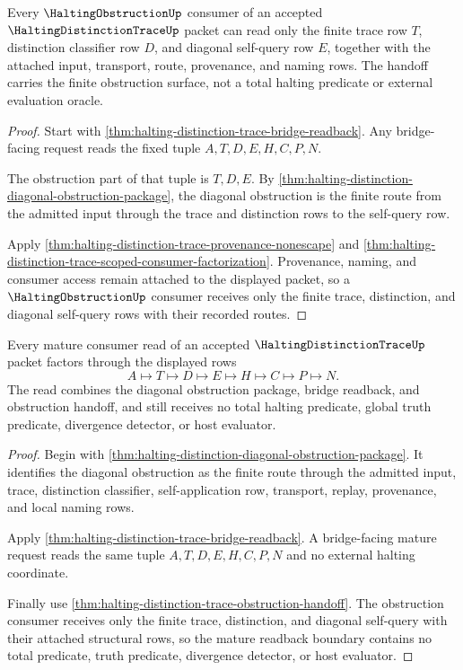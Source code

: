 \begin{theorem}
\label{thm:halting-distinction-trace-obstruction-handoff}
Every $\HaltingObstructionUp$ consumer of an accepted $\HaltingDistinctionTraceUp$ packet can read only the finite trace row $T$, distinction classifier row $D$, and diagonal self-query row $E$, together with the attached input, transport, route, provenance, and naming rows. The handoff carries the finite obstruction surface, not a total halting predicate or external evaluation oracle.
\end{theorem}
\begin{proof}
Start with \autoref{thm:halting-distinction-trace-bridge-readback}. Any bridge-facing request reads the fixed tuple $A,T,D,E,H,C,P,N$.

The obstruction part of that tuple is $T,D,E$. By \autoref{thm:halting-distinction-diagonal-obstruction-package}, the diagonal obstruction is the finite route from the admitted input through the trace and distinction rows to the self-query row.

Apply \autoref{thm:halting-distinction-trace-provenance-nonescape} and \autoref{thm:halting-distinction-trace-scoped-consumer-factorization}. Provenance, naming, and consumer access remain attached to the displayed packet, so a $\HaltingObstructionUp$ consumer receives only the finite trace, distinction, and diagonal self-query rows with their recorded routes.
\end{proof}

\begin{theorem}
\label{thm:halting-distinction-trace-mature-boundary-readback}
Every mature consumer read of an accepted $\HaltingDistinctionTraceUp$ packet factors through the displayed rows
$$
A \longmapsto T \longmapsto D \longmapsto E \longmapsto H \longmapsto C \longmapsto P \longmapsto N.
$$
The read combines the diagonal obstruction package, bridge readback, and obstruction handoff, and still receives no total halting predicate, global truth predicate, divergence detector, or host evaluator.
\end{theorem}
\begin{proof}
Begin with \autoref{thm:halting-distinction-diagonal-obstruction-package}. It identifies the diagonal obstruction as the finite route through the admitted input, trace, distinction classifier, self-application row, transport, replay, provenance, and local naming rows.

Apply \autoref{thm:halting-distinction-trace-bridge-readback}. A bridge-facing mature request reads the same tuple $A,T,D,E,H,C,P,N$ and no external halting coordinate.

Finally use \autoref{thm:halting-distinction-trace-obstruction-handoff}. The obstruction consumer receives only the finite trace, distinction, and diagonal self-query with their attached structural rows, so the mature readback boundary contains no total predicate, truth predicate, divergence detector, or host evaluator.
\end{proof}

